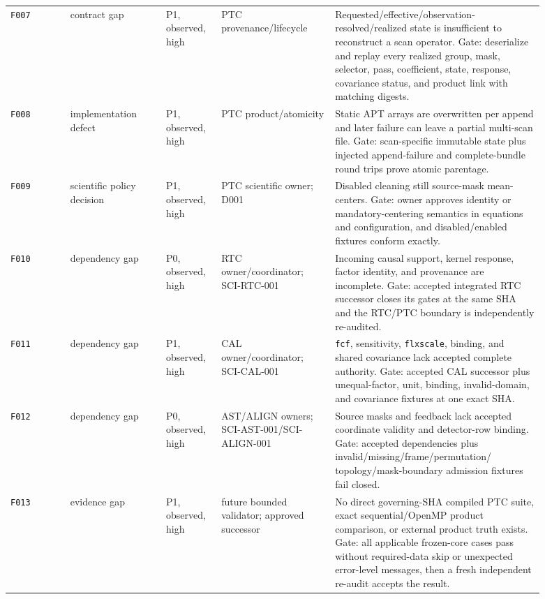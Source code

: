 \documentclass[11pt]{article}
\newcommand{\code}[1]{\nolinkurl{#1}}
\begin{document}
\begin{longtable}{L{0.10\linewidth}L{0.165\linewidth}L{0.09\linewidth}L{0.19\linewidth}L{0.35\linewidth}}
\code{F007} & contract gap & P1, observed, high &
PTC provenance/lifecycle &
Requested/effective/observation-resolved/realized state is insufficient to
reconstruct a scan operator.  Gate: deserialize and replay every realized
group, mask, selector, pass, coefficient, state, response, covariance status,
and product link with matching digests.\\
\code{F008} & implementation defect & P1, observed, high &
PTC product/atomicity &
Static APT arrays are overwritten per append and later failure can leave a
partial multi-scan file.  Gate: scan-specific immutable state plus injected
append-failure and complete-bundle round trips prove atomic parentage.\\
\code{F009} & scientific policy decision & P1, observed, high &
PTC scientific owner; D001 &
Disabled cleaning still source-mask mean-centers.  Gate: owner approves
identity or mandatory-centering semantics in equations and configuration, and
disabled/enabled fixtures conform exactly.\\
\code{F010} & dependency gap & P0, observed, high &
RTC owner/coordinator; SCI-RTC-001 &
Incoming causal support, kernel response, factor identity, and provenance are
incomplete.  Gate: accepted integrated RTC successor closes its gates at the
same SHA and the RTC/PTC boundary is independently re-audited.\\
\code{F011} & dependency gap & P1, observed, high &
CAL owner/coordinator; SCI-CAL-001 &
\code{fcf}, sensitivity, \code{flxscale}, binding, and shared covariance lack
accepted complete authority.  Gate: accepted CAL successor plus unequal-factor,
unit, binding, invalid-domain, and covariance fixtures at one exact SHA.\\
\code{F012} & dependency gap & P0, observed, high &
AST/ALIGN owners; SCI-AST-001/SCI-ALIGN-001 &
Source masks and feedback lack accepted coordinate validity and detector-row
binding.  Gate: accepted dependencies plus invalid/missing/frame/permutation/
topology/mask-boundary admission fixtures fail closed.\\
\code{F013} & evidence gap & P1, observed, high &
future bounded validator; approved successor &
No direct governing-SHA compiled PTC suite, exact sequential/OpenMP product
comparison, or external product truth exists.  Gate: all applicable frozen-core
cases pass without required-data skip or unexpected error-level messages,
then a fresh independent re-audit accepts the result.\\
\bottomrule
\end{longtable}
\end{document}
